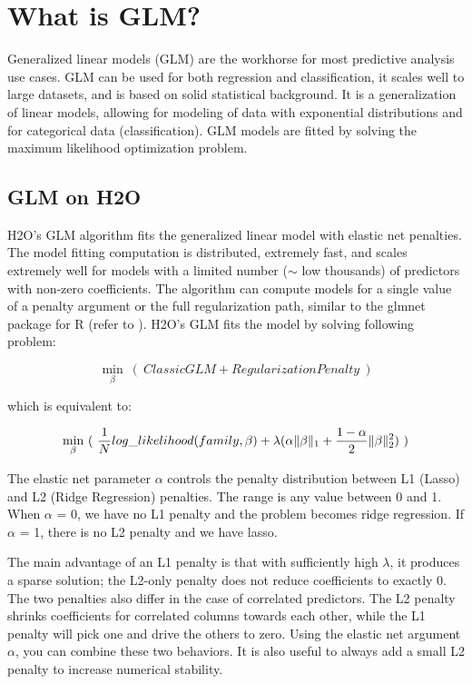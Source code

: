 \documentclass[11pt]{article}
\begin{document}
\section{What is GLM?}
Generalized linear models (GLM) are the workhorse for most predictive analysis use cases. GLM can be used for both regression and classification, it scales well to large datasets, and is based on solid statistical background. It is a generalization of linear models, allowing for modeling of data with exponential distributions and for categorical data (classification). GLM models are fitted by solving the maximum likelihood optimization problem.

\subsection{GLM on H2O}
H2O's GLM algorithm fits the generalized linear model with elastic net penalties. The model fitting computation is distributed, extremely fast, and scales extremely well for models with a limited number ($\mathtt{\sim}$ low thousands) of predictors with non-zero coefficients. The algorithm can compute models for a single value of a penalty argument or the full regularization path, similar to the glmnet package for R (refer to ). 
H2O's GLM fits the model by solving following problem:

\[ \min\limits_{\beta}\ (\ Classic GLM  + Regularization Penalty \ )\]

which is equivalent to:

\[ \min\limits_{\beta}\ (\ {{1\over{N}} log\_likelihood(family,\beta)  + \lambda (\alpha \| \beta \|_1} + {1- \alpha \over 2} \| \beta \|_2^2) \ )\]

\bigskip
The elastic net parameter $\alpha$ controls the penalty distribution between L1 (Lasso) and L2 (Ridge Regression) penalties. The range is any value between 0 and 1. When $\alpha$ = 0, we have no L1 penalty and the problem becomes ridge regression. If $\alpha$ = 1, there is no L2 penalty and we have lasso.

The main advantage of an L1 penalty is that with sufficiently high $\lambda$, it produces a sparse solution; the L2-only penalty does not reduce coefficients to exactly 0. The two penalties also differ in the case of correlated predictors. The L2 penalty shrinks coefficients for correlated columns towards each other, while the L1 penalty will pick one and drive the others to zero. Using the elastic net argument $\alpha$, you can combine these two behaviors. It is also useful to always add a small L2 penalty to increase numerical stability.
\end{document}
